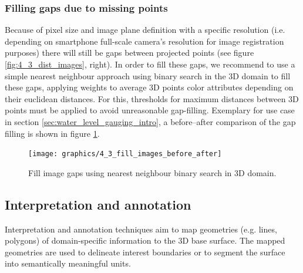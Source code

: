 \documentclass[review]{elsarticle}
\begin{document}
\subsubsection{Filling gaps due to missing points}
Because of pixel size and image plane definition with a specific resolution (i.e. depending on smartphone full-scale camera's resolution for image registration purposes) there will still be gaps between projected points (see figure \ref{fig:4_3_dist_images}, right). In order to fill these gaps, we recommend to use a simple nearest neighbour approach using binary search \cite{Bentley1975} in the 3D domain to fill these gaps, applying weights to average 3D points color attributes depending on their euclidean distances. For this, thresholds for maximum distances between 3D points must be applied to avoid unreasonable gap-filling. Exemplary for use case in section \ref{sec:water_level_gauging_intro}, a before--after comparison of the gap filling is shown in figure \ref{fig:4_3_fill_images_before_after}. %

\begin{figure}[h]
\centering
\texttt{[image: graphics/4\_3\_fill\_images\_before\_after]}
\caption{Fill image gaps using nearest neighbour binary search in 3D domain.}
\label{fig:4_3_fill_images_before_after}
\end{figure}


\subsection{Interpretation and annotation}
\label{sec:algorithms:interpretation}

Interpretation and annotation techniques aim to map geometries (e.g. lines, polygons) of domain-specific information to the 3D base surface. The mapped geometries are used to delineate interest boundaries or to segment the surface into semantically meaningful units.
\end{document}
